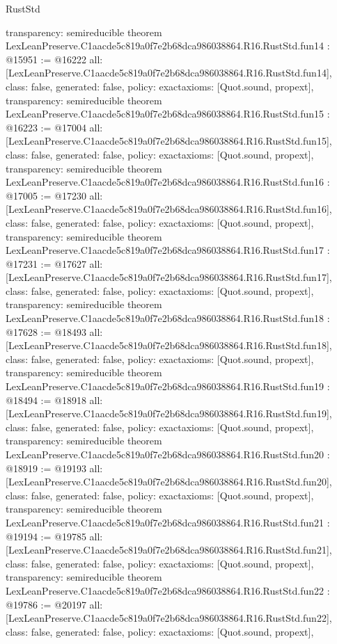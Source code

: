 \begin{lexlean}{RustStd}
\begin{coremodule}
{  transparency: semireducible
}
theorem LexLeanPreserve.C1aacde5c819a0f7e2b68dca986038864.R16.RustStd.fun14 : @15951 := @16222 {
  all: [LexLeanPreserve.C1aacde5c819a0f7e2b68dca986038864.R16.RustStd.fun14],
  class: false,
  generated: false,
  policy: exact{axioms: [Quot.sound, propext]},
  transparency: semireducible
}
theorem LexLeanPreserve.C1aacde5c819a0f7e2b68dca986038864.R16.RustStd.fun15 : @16223 := @17004 {
  all: [LexLeanPreserve.C1aacde5c819a0f7e2b68dca986038864.R16.RustStd.fun15],
  class: false,
  generated: false,
  policy: exact{axioms: [Quot.sound, propext]},
  transparency: semireducible
}
theorem LexLeanPreserve.C1aacde5c819a0f7e2b68dca986038864.R16.RustStd.fun16 : @17005 := @17230 {
  all: [LexLeanPreserve.C1aacde5c819a0f7e2b68dca986038864.R16.RustStd.fun16],
  class: false,
  generated: false,
  policy: exact{axioms: [Quot.sound, propext]},
  transparency: semireducible
}
theorem LexLeanPreserve.C1aacde5c819a0f7e2b68dca986038864.R16.RustStd.fun17 : @17231 := @17627 {
  all: [LexLeanPreserve.C1aacde5c819a0f7e2b68dca986038864.R16.RustStd.fun17],
  class: false,
  generated: false,
  policy: exact{axioms: [Quot.sound, propext]},
  transparency: semireducible
}
theorem LexLeanPreserve.C1aacde5c819a0f7e2b68dca986038864.R16.RustStd.fun18 : @17628 := @18493 {
  all: [LexLeanPreserve.C1aacde5c819a0f7e2b68dca986038864.R16.RustStd.fun18],
  class: false,
  generated: false,
  policy: exact{axioms: [Quot.sound, propext]},
  transparency: semireducible
}
theorem LexLeanPreserve.C1aacde5c819a0f7e2b68dca986038864.R16.RustStd.fun19 : @18494 := @18918 {
  all: [LexLeanPreserve.C1aacde5c819a0f7e2b68dca986038864.R16.RustStd.fun19],
  class: false,
  generated: false,
  policy: exact{axioms: [Quot.sound, propext]},
  transparency: semireducible
}
theorem LexLeanPreserve.C1aacde5c819a0f7e2b68dca986038864.R16.RustStd.fun20 : @18919 := @19193 {
  all: [LexLeanPreserve.C1aacde5c819a0f7e2b68dca986038864.R16.RustStd.fun20],
  class: false,
  generated: false,
  policy: exact{axioms: [Quot.sound, propext]},
  transparency: semireducible
}
theorem LexLeanPreserve.C1aacde5c819a0f7e2b68dca986038864.R16.RustStd.fun21 : @19194 := @19785 {
  all: [LexLeanPreserve.C1aacde5c819a0f7e2b68dca986038864.R16.RustStd.fun21],
  class: false,
  generated: false,
  policy: exact{axioms: [Quot.sound, propext]},
  transparency: semireducible
}
theorem LexLeanPreserve.C1aacde5c819a0f7e2b68dca986038864.R16.RustStd.fun22 : @19786 := @20197 {
  all: [LexLeanPreserve.C1aacde5c819a0f7e2b68dca986038864.R16.RustStd.fun22],
  class: false,
  generated: false,
  policy: exact{axioms: [Quot.sound, propext]},
}
\end{coremodule}
\end{lexlean}
